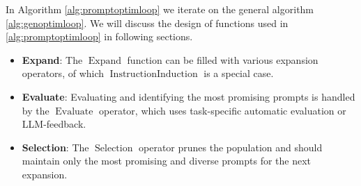 In Algorithm \ref{alg:promptoptimloop} we iterate on the general algorithm \ref{alg:genoptimloop}. 
We will discuss the design of functions used in \ref{alg:promptoptimloop} in following sections.

\begin{itemize}
    \item \textbf{Expand}: The $\operatorname{Expand}$ function can be filled with various expansion operators, of which $\operatorname{InstructionInduction}$
    is a special case. 
    \item \textbf{Evaluate}: Evaluating and identifying the most promising prompts is handled by the $\operatorname{Evaluate}$ operator, which uses task-specific automatic evaluation or LLM-feedback.
    \item \textbf{Selection}: The $\operatorname{Selection}$ operator prunes the population and should maintain only the most promising and diverse prompts for the next expansion.
\end{itemize}

